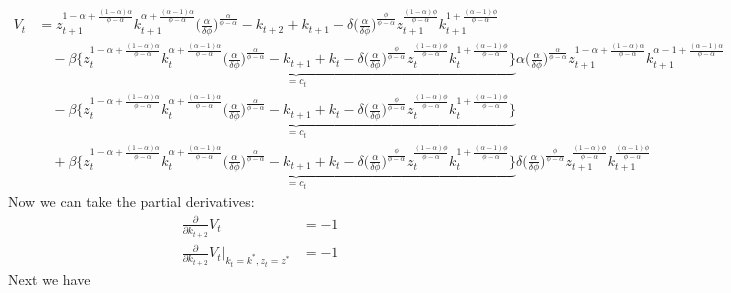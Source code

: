 \documentclass[a4paper]{article}
\theoremstyle{definition}
\begin{document}
	\begin{align*}
	V_t 	&= z_{t+1}^{1-\alpha+\frac{(1-\alpha)\alpha}{\phi-\alpha}} k_{t+1}^{\alpha+\frac{(\alpha-1)\alpha}{\phi-\alpha}} \Big( \frac{\alpha}{\delta\phi} \Big)^{\frac{\alpha}{\phi-\alpha}}-k_{t+2} + k_{t+1} - \delta \Big( \frac{\alpha}{\delta\phi} \Big)^{\frac{\phi}{\phi-\alpha}}z_{t+1}^{\frac{(1-\alpha)\phi}{\phi-\alpha}}k_{t+1}^{1+\frac{(\alpha-1)\phi}{\phi-\alpha}} \\
			&\quad - \beta \underbrace{\Big\{ z_{t}^{1-\alpha+\frac{(1-\alpha)\alpha}{\phi-\alpha}} k_{t}^{\alpha+\frac{(\alpha-1)\alpha}{\phi-\alpha}} \Big( \frac{\alpha}{\delta\phi} \Big)^{\frac{\alpha}{\phi-\alpha}}-k_{t+1} + k_{t} - \delta \Big( \frac{\alpha}{\delta\phi} \Big)^{\frac{\phi}{\phi-\alpha}}z_{t}^{\frac{(1-\alpha)\phi}{\phi-\alpha}}k_{t}^{1+\frac{(\alpha-1)\phi}{\phi-\alpha}} \Big\}}_{=c_t} \alpha \Big( \frac{\alpha}{\delta\phi} \Big)^{\frac{\alpha}{\phi-\alpha}} z_{t+1}^{1-\alpha+\frac{(1-\alpha)\alpha}{\phi-\alpha}}k_{t+1}^{\alpha-1+\frac{(\alpha-1)\alpha}{\phi-\alpha}} \\
			&\quad - \beta \underbrace{\Big\{ z_{t}^{1-\alpha+\frac{(1-\alpha)\alpha}{\phi-\alpha}} k_{t}^{\alpha+\frac{(\alpha-1)\alpha}{\phi-\alpha}} \Big( \frac{\alpha}{\delta\phi} \Big)^{\frac{\alpha}{\phi-\alpha}}-k_{t+1} + k_{t} - \delta \Big( \frac{\alpha}{\delta\phi} \Big)^{\frac{\phi}{\phi-\alpha}}z_{t}^{\frac{(1-\alpha)\phi}{\phi-\alpha}}k_{t}^{1+\frac{(\alpha-1)\phi}{\phi-\alpha}} \Big\}}_{=c_t} \\
			&\quad + \beta \underbrace{\Big\{ z_{t}^{1-\alpha+\frac{(1-\alpha)\alpha}{\phi-\alpha}} k_{t}^{\alpha+\frac{(\alpha-1)\alpha}{\phi-\alpha}} \Big( \frac{\alpha}{\delta\phi} \Big)^{\frac{\alpha}{\phi-\alpha}}-k_{t+1} + k_{t} - \delta \Big( \frac{\alpha}{\delta\phi} \Big)^{\frac{\phi}{\phi-\alpha}}z_{t}^{\frac{(1-\alpha)\phi}{\phi-\alpha}}k_{t}^{1+\frac{(\alpha-1)\phi}{\phi-\alpha}} \Big\}}_{=c_t} \delta \Big( \frac{\alpha}{\delta\phi} \Big)^{\frac{\phi}{\phi-\alpha}}z_{t+1}^{\frac{(1-\alpha)\phi}{\phi-\alpha}}k_{t+1}^{\frac{(\alpha-1)\phi}{\phi-\alpha}}
	\end{align*}	
Now we can take the partial derivatives:
	\begin{align*}
	\frac{\partial}{\partial k_{t+2}}V_t 									&= -1  \\
	\frac{\partial}{\partial k_{t+2}}V_t |_{k_{t}=k^*,z_{t}=z^*} 	&= -1 
	\end{align*}	
Next we have	
\end{document}
